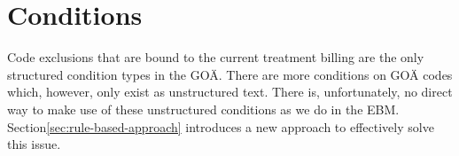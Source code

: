 \section{Conditions}\label{sec:goae-conditions}
Code exclusions that are bound to the current treatment billing are the only structured condition types in the GOÄ.
There are more conditions on GOÄ codes which, however, only exist as unstructured text.
There is, unfortunately, no direct way to make use of these unstructured conditions as we do in the EBM.
Section\ref{sec:rule-based-approach} introduces a new approach to effectively solve this issue.
